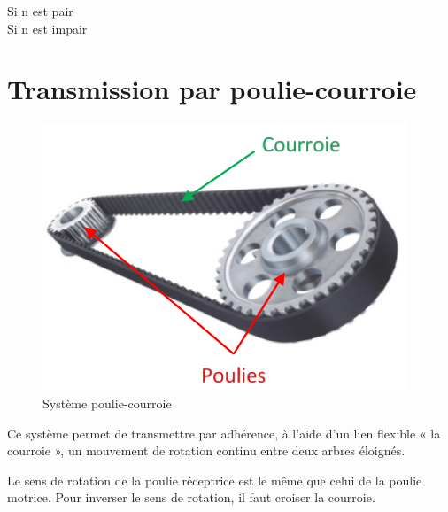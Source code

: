 \documentclass[10pt,fleqn]{article} %
\begin{document}
\begin{warn}
\begin{description}
  \item [Si n est pair] 
  \item [Si n est impair] 
\end{description}
\end{warn}

\section{Transmission par poulie-courroie}
\begin{figure}[h]
  \centering
  \includegraphics[width=.4\textwidth]{images/poulie-courroie}

  \caption{Système poulie-courroie}
  \label{}
\end{figure}
Ce système permet de transmettre par adhérence, à l’aide d’un lien flexible « la courroie », un mouvement de rotation continu entre deux arbres éloignés.


\begin{aretenir}
  \vspace{4cm}
\end{aretenir}

\begin{warn}
  Le sens de rotation de la poulie réceptrice est le même que celui de la poulie motrice. Pour inverser le sens de rotation, il faut croiser la courroie.
\end{warn}
\end{document}
